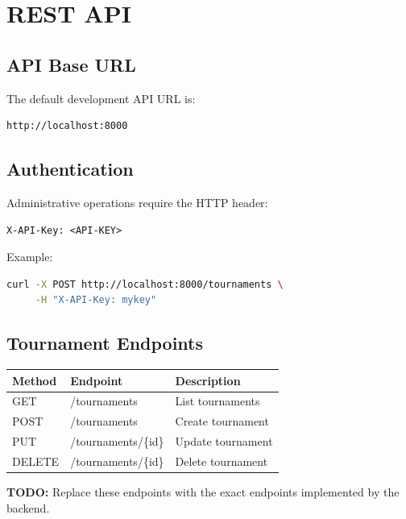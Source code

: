 \documentclass[12pt,a4paper]{article}
\begin{document}

\section{REST API}

\subsection{API Base URL}

The default development API URL is:

\begin{lstlisting}
http://localhost:8000
\end{lstlisting}

\subsection{Authentication}

Administrative operations require the HTTP header:

\begin{lstlisting}
X-API-Key: <API-KEY>
\end{lstlisting}

Example:

\begin{lstlisting}[language=bash]
curl -X POST http://localhost:8000/tournaments \
     -H "X-API-Key: mykey"
\end{lstlisting}

\subsection{Tournament Endpoints}

\begin{longtable}{lll}
\toprule
\textbf{Method} & \textbf{Endpoint} & \textbf{Description}\\
\midrule
GET & /tournaments & List tournaments\\
POST & /tournaments & Create tournament\\
PUT & /tournaments/\{id\} & Update tournament\\
DELETE & /tournaments/\{id\} & Delete tournament\\
\bottomrule
\end{longtable}

\textbf{TODO:} Replace these endpoints with the exact endpoints
implemented by the backend.
\end{document}
